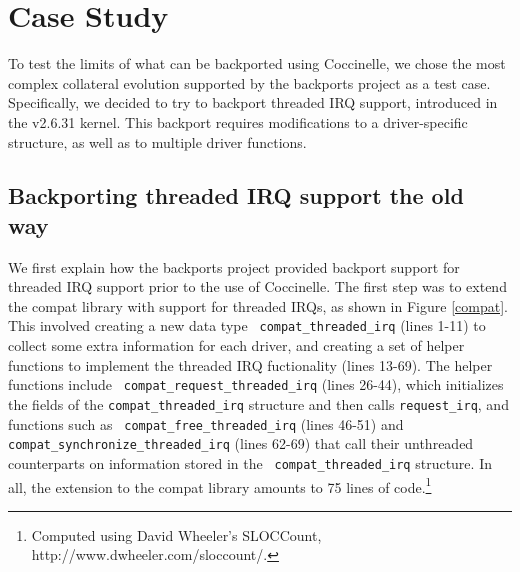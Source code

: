 \section{Case Study}
\label{case}

To test the limits of what can be backported using Coccinelle, we chose the
most complex collateral evolution supported by the backports project as a
test case.  Specifically, we decided to try to backport threaded IRQ
support, introduced in the v2.6.31 kernel.  This backport requires
modifications to a driver-specific structure, as well as to multiple driver
functions.

\subsection{Backporting threaded IRQ support the old way}

We first explain how the backports project provided backport support for
threaded IRQ support prior to the use of Coccinelle.  The first step was to
extend the compat library with support for threaded IRQs, as shown in
Figure \ref{compat}.  This involved creating a new data type {\tt
  compat\_\-threa\-ded\_\-irq} (lines 1-11) to collect some extra information
for each driver, and creating a set of helper functions to implement the
threaded IRQ fuctionality (lines 13-69).  The helper functions include {\tt
  compat\_\-request\_\-threa\-ded\_\-irq} (lines 26-44), which initializes
the fields of the {\tt compat\_\-threa\-ded\_\-irq} structure and then calls
{\tt request\_\-irq}, and functions such as {\tt
  compat\_\-free\_\-threa\-ded\_\-irq} (lines 46-51) and {\tt
  compat\_\-synchronize\_\-threa\-ded\_\-irq} (lines 62-69) that call their
unthreaded counterparts on information stored in the {\tt
  compat\_\-threa\-ded\_\-irq} structure.  In all, the extension to the
compat library amounts to 75 lines of code.\footnote{Computed using David
  Wheeler's SLOCCount, \newline http://www.dwheeler.com/sloccount/.}



